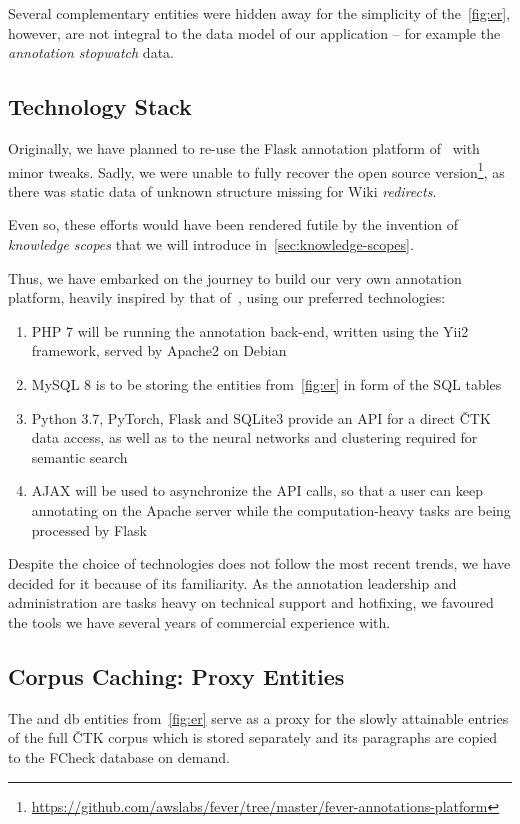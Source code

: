 Several complementary entities were hidden away for the simplicity of the~\ref{fig:er}, however, are not integral to the data model of our application -- for example the \textit{annotation stopwatch} data.

\subsection{Technology Stack}
Originally, we have planned to re-use the \textsf{Flask} annotation platform of~\cite{fever} with minor tweaks. Sadly, we were unable to fully recover the open source version\footnote{\url{https://github.com/awslabs/fever/tree/master/fever-annotations-platform}}, as there was static data of unknown structure missing for \textsf{Wiki} \textit{redirects}.

Even so, these efforts would have been rendered futile by the invention of \textit{knowledge scopes} that we will introduce in~\ref{sec:knowledge-scopes}.

Thus, we have embarked on the journey to build our very own annotation platform, heavily inspired by that of~\cite{fever}, using our preferred technologies:

\begin{enumerate}
    \item {\techbf PHP 7} will be running the annotation back-end, written using the {\techbf Yii2} framework, served by {\techbf Apache2} on {\techbf Debian} 
    \item {\techbf MySQL 8} is to be storing the entities from~\ref{fig:er} in form of the \textsf{SQL} tables
    \item {\techbf Python 3.7}, {\techbf PyTorch}, {\techbf Flask} and {\techbf SQLite3} provide an \textsf{API} for a direct {\textsf{ČTK}} data access, as well as to the neural networks and clustering required for semantic search
    \item {\techbf AJAX} will be used to asynchronize the \textsf{API} calls, so that a user can keep annotating on the \textsf{Apache} server while the computation-heavy tasks are being processed by \textsf{Flask}
\end{enumerate}
Despite the choice of technologies does not follow the most recent trends, we have decided for it because of its familiarity. As the annotation leadership and administration are tasks heavy on technical support and hotfixing, we favoured the tools we have several years of commercial experience with.


\subsection{Corpus Caching: Proxy Entities}
\label{sec:proxies}
The  and  \textsf{db} entities from~\ref{fig:er} serve as a proxy for the slowly attainable entries of the full \textsf{ČTK} corpus which is stored separately and its paragraphs are copied to the \textsf{FCheck} database on demand.

